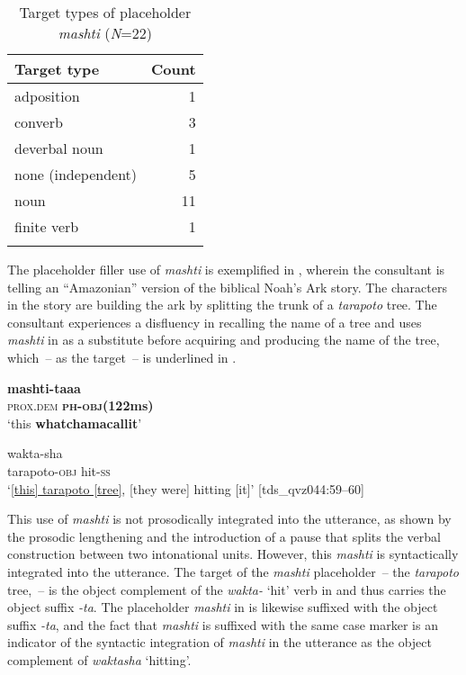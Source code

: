 \documentclass[output=paper]{langscibook}
\begin{document}
\begin{table}
\begin{tabular}{lr}
\lsptoprule
Target type & Count\\
\midrule
adposition & 1\\
converb & 3\\
deverbal noun & 1\\
none (independent) & 5\\
noun & 11\\
finite verb & 1\\
\lspbottomrule
\end{tabular}
\caption{\label{tab:rice:5} Target types of placeholder \textit{mashti} (\textit{N}=22)}
\end{table}

The placeholder filler use of \textit{mashti} is exemplified in , wherein the consultant is telling an “Amazonian” version of the biblical Noah’s Ark story. The characters in the story are building the ark by splitting the trunk of a \textit{tarapoto} tree. The consultant experiences a disfluency in recalling the name of a tree and uses \textit{mashti} in  as a substitute before acquiring and producing the name of the tree, which~-- as the target~-- is underlined in .

\ea%
\label{ex:rice:7}
\ea \label{ex:rice:7a}
 {\textbf{mashti-taaa}}    {{}}\\
{\textsc{prox.dem}}  {{\textbf{\textsc{ph-obj}}}\textbf{(122ms)}} {} \\
\glt ‘this \textbf{whatchamacallit}’
\medskip

\ex \label{ex:rice:7b}   {wakta-sha}\\
{tarapoto-\textsc{obj}}  {hit-\textsc{ss}}\\
\glt ‘\uline{[this] tarapoto [tree]}, [they were] hitting [it]’ [tds\_qvz044:59--60]
\z
\z

This use of \textit{mashti} is not prosodically integrated into the utterance, as shown by the prosodic lengthening and the introduction of a pause that splits the verbal construction between two intonational units. However, this \textit{mashti} is syntactically integrated into the utterance. The target of the \textit{mashti} placeholder~-- the \textit{tarapoto} tree,~-- is the object complement of the \textit{wakta-} ‘hit’ verb in  and thus carries the object suffix \textit{{}-ta}. The placeholder \textit{mashti} in  is likewise suffixed with the object suffix \textit{\nobreakdash-ta}, and the fact that \textit{mashti} is suffixed with the same case marker is an indicator of the syntactic integration of \textit{mashti} in the utterance as the object complement of \textit{waktasha} ‘hitting’. 
\end{document}
